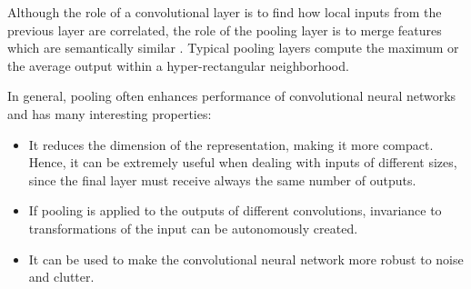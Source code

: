             Although the role of a convolutional layer is to find how local inputs from the previous layer are correlated, the role of the pooling layer is to merge features which are semantically similar \cite{LeCunDeepLearning}. Typical pooling layers compute the maximum or the average output within a hyper-rectangular neighborhood.
            
            In general, pooling often enhances performance of convolutional neural networks \cite{Boureau} and has many interesting properties:
            \begin{itemize}
                \item It reduces the dimension of the representation, making it more compact. Hence, it can be extremely useful when dealing with inputs of different sizes, since the final layer must receive always the same number of outputs.
                \item If pooling is applied to the outputs of different convolutions, invariance to transformations of the input can be autonomously created.
                \item It can be used to make the convolutional neural network more robust to noise and clutter.
            \end{itemize}